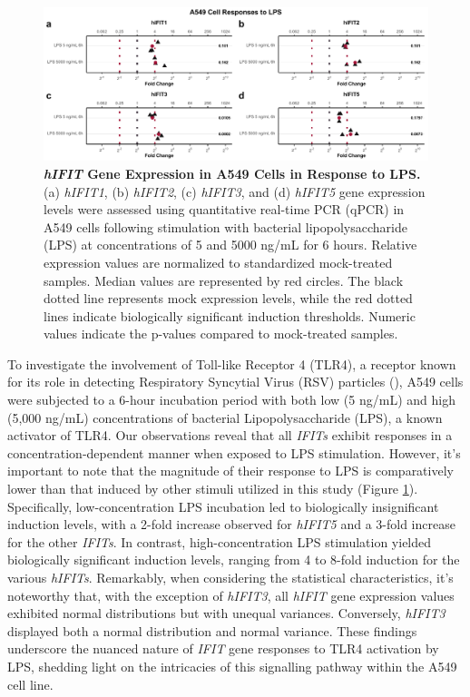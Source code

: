 \begin{figure}
    \centering
    \includegraphics[width=1\linewidth]{06. Chapter 1/Figs/01. Induction/03. a549_treat_lps.pdf}
    \caption[\textit{hIFIT} Gene Expression in A549 Cells in Response to LPS.]{\textbf{\textit{hIFIT} Gene Expression in A549 Cells in Response to LPS.} (a) \textit{hIFIT1}, (b) \textit{hIFIT2}, (c) \textit{hIFIT3}, and (d) \textit{hIFIT5} gene expression levels were assessed using quantitative real-time PCR (qPCR) in A549 cells following stimulation with bacterial lipopolysaccharide (LPS) at concentrations of 5 and 5000 ng/mL for 6 hours. Relative expression values are normalized to standardized mock-treated samples. Median values are represented by red circles. The black dotted line represents mock expression levels, while the red dotted lines indicate biologically significant induction thresholds. Numeric values indicate the p-values compared to mock-treated samples.}
    \label{fig:A549 Response to LPS}
\end{figure}

To investigate the involvement of Toll-like Receptor 4 (TLR4), a receptor known for its role in detecting Respiratory Syncytial Virus (RSV) particles (\cite{Funchal2015RespiratoryNeutrophils}), A549 cells were subjected to a 6-hour incubation period with both low (5 ng/mL) and high (5,000 ng/mL) concentrations of bacterial Lipopolysaccharide (LPS), a known activator of TLR4. Our observations reveal that all \textit{IFITs} exhibit responses in a concentration-dependent manner when exposed to LPS stimulation. However, it's important to note that the magnitude of their response to LPS is comparatively lower than that induced by other stimuli utilized in this study (Figure \ref{fig:A549 Response to LPS}). Specifically, low-concentration LPS incubation led to biologically insignificant induction levels, with a 2-fold increase observed for \textit{hIFIT5} and a 3-fold increase for the other \textit{IFITs}. In contrast, high-concentration LPS stimulation yielded biologically significant induction levels, ranging from 4 to 8-fold induction for the various \textit{hIFITs}. Remarkably, when considering the statistical characteristics, it's noteworthy that, with the exception of \textit{hIFIT3}, all \textit{hIFIT} gene expression values exhibited normal distributions but with unequal variances. Conversely, \textit{hIFIT3} displayed both a normal distribution and normal variance. These findings underscore the nuanced nature of \textit{IFIT} gene responses to TLR4 activation by LPS, shedding light on the intricacies of this signalling pathway within the A549 cell line.

